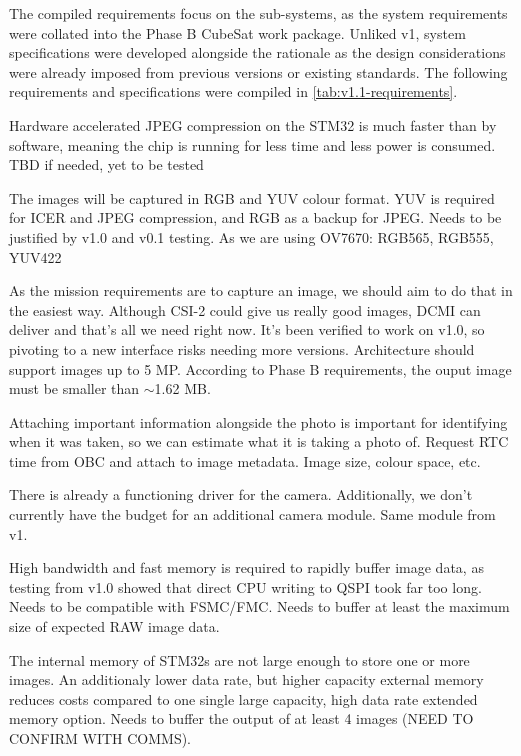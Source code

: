 The compiled requirements focus on the sub-systems, as the system requirements were collated into the Phase B CubeSat work package. Unliked v1, system specifications were developed alongside the rationale as the design considerations were already imposed from previous versions or existing standards. The following requirements and specifications were compiled in \autoref{tab:v1.1-requirements}.


{Hardware accelerated JPEG compression on the STM32 is much faster than by software, meaning the chip is running for less time and less power is consumed.}
{TBD if needed, yet to be tested}

{The images will be captured in RGB and YUV colour format. YUV is required for ICER and JPEG compression, and RGB as a backup for JPEG.}
{Needs to be justified by v1.0 and v0.1 testing. As we are using OV7670: RGB565, RGB555, YUV422}

{As the mission requirements are to capture an image, we should aim to do that in the easiest way. Although CSI-2 could give us really good images, DCMI can deliver and that's all we need right now. It's been verified to work on v1.0, so pivoting to a new interface risks needing more versions.}
{Architecture should support images up to 5 MP. According to Phase B requirements, the ouput image must be smaller than $\sim$1.62 MB.}

{Attaching important information alongside the photo is important for identifying when it was taken, so we can estimate what it is taking a photo of.}
{Request RTC time from OBC and attach to image metadata. Image size, colour space, etc.}

{There is already a functioning driver for the camera. Additionally, we don't currently have the budget for an additional camera module.}
{Same module from v1.}


{High bandwidth and fast memory is required to rapidly buffer image data, as testing from v1.0 showed that direct CPU writing to QSPI took far too long.}
{Needs to be compatible with FSMC/FMC. Needs to buffer at least the maximum size of expected RAW image data.}

{The internal memory of STM32s are not large enough to store one or more images. An additionaly lower data rate, but higher capacity external memory reduces costs compared to one single large capacity, high data rate extended memory option.}
{Needs to buffer the output of at least 4 images (NEED TO CONFIRM WITH COMMS).}

